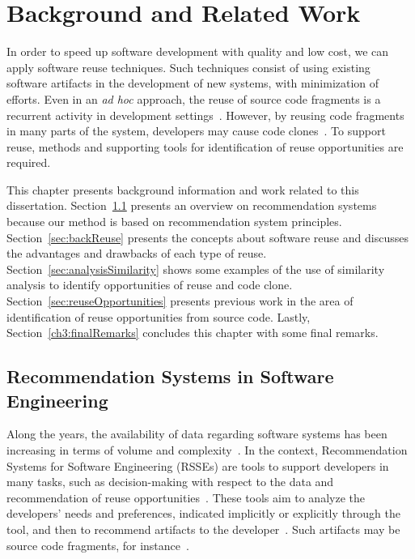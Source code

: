 \chapter{Background and Related Work}
\label{ch:background}

In order to speed up software development with quality and low cost, we can apply software reuse techniques. Such techniques consist of using existing software artifacts in the development of new systems, with minimization of efforts. Even in an \textit{ad hoc} approach, the reuse of source code fragments is a recurrent activity in development settings~\citep{Ajila:2012,Wang:2012,Xue:2011}. However, by reusing code fragments in many parts of the system, developers may cause code clones~\citep{fowler2009refactoring,marcus2001identification,Patil:2015}. To support reuse, methods and supporting tools for identification of reuse opportunities are required.

 This chapter presents background information and work related to this dissertation. Section~\ref{sec:recommendationSystem} presents an overview on recommendation systems because our method  is based on recommendation system principles. Section~\ref{sec:backReuse} presents the concepts about software reuse and discusses the  advantages and drawbacks of each type of reuse. Section~\ref{sec:analysisSimilarity} shows some examples of the use of similarity analysis to identify opportunities of  reuse and code clone. Section~\ref{sec:reuseOpportunities} presents previous work in the area of identification of reuse opportunities from  source code. Lastly, Section~\ref{ch3:finalRemarks} concludes this chapter with some final remarks.


\section{Recommendation Systems in Software Engineering}
\label{sec:recommendationSystem}

Along the years, the availability of data regarding software systems has been increasing in terms of volume and complexity~\citep{Herlocker:2004}. In the context, Recommendation Systems for Software Engineering (RSSEs) are tools to support developers in many tasks, such as decision-making with respect to the data and recommendation of reuse opportunities~\citep{Cubranic}. These tools aim to analyze the developers' needs and preferences, indicated implicitly or explicitly through the tool, and then to recommend artifacts to the developer~\citep{Robillard:2010}. Such artifacts may be source code fragments, for instance~\citep{Holmes}.

